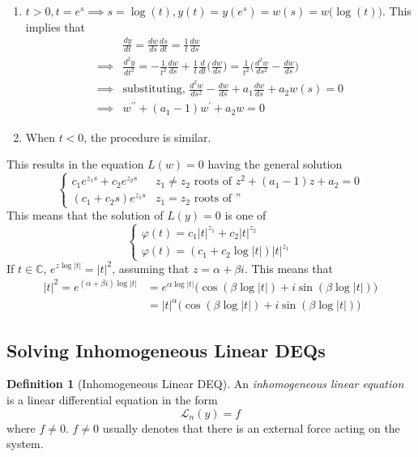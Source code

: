 \documentclass{article}
\theoremstyle{remark}
\theoremstyle{definition}
\newtheorem{definition}{Definition}[section]
\begin{document}
\begin{enumerate}
    \item $t > 0, t = e^s \implies s = \log(t), y(t) = y(e^s) = w(s) = w \big( \log(t)\big)$. This implies that
    \begin{align*}
        & \frac{d y}{d t} = \frac{dw}{ds} \frac{ds}{dt} = \frac{1}{t} \frac{dw}{ds} \\
        \implies & \frac{d^2 y}{dt^2} = -\frac{1}{t^2} \frac{dw}{ds} + \frac{1}{t} \frac{d}{dt} \bigg( \frac{dw}{ds}\bigg) = \frac{1}{t^2} \bigg( \frac{d^2 w}{ds^2} - \frac{dw}{ds} \bigg) \\
        \implies & \text{substituting, } \frac{d^2 w}{ds^2} - \frac{dw}{ds} + a_1 \frac{dw}{ds} + a_2 w(s) = 0 \\
        \implies & w^{\prime\prime} + (a_1 - 1) w^\prime + a_2 w = 0
    \end{align*}
    \item When $t<0$, the procedure is similar. 
\end{enumerate}
This results in the equation $L(w) =0$ having the general solution 
\[\begin{cases}
c_1 e^{z_1 s} + c_2 e^{z_2 s} & z_1 \neq z_2 \text{ roots of } z^2 + (a_1 - 1) z + a_2 = 0 \\
(c_1 + c_2 s) e^{z_1 s} & z_1 = z_2 \text{ roots of ''}
\end{cases}\]
This means that the solution of $L(y) = 0$ is one of
\[\begin{cases}
\varphi(t) = c_1 |t|^{z_1} + c_2 |t|^{z_2} \\
\varphi(t) = (c_1 + c_2 \log|t|) |t|^{z_1}
\end{cases}\]
If $t \in \mathbb{C}$, $e^{z \log|t|} = |t|^2$, assuming that $z = \alpha + \beta i$. This means that 
\begin{align*}
    |t|^2 = e^{(\alpha + \beta i) \log|t|} & = e^{\alpha \log|t|} \big( \cos{(\beta \log|t|)} + i \sin{(\beta \log|t|)}\big) \\
    & = |t|^\alpha \big( \cos{(\beta \log|t|)} + i \sin{(\beta \log|t|)}\big)
\end{align*}



\subsection{Solving Inhomogeneous Linear DEQs}
\begin{definition}[Inhomogeneous Linear DEQ]
An \textit{inhomogeneous linear equation} is a linear differential equation in the form
\[\mathcal{L}_n (y) = f\]
where $f \neq 0$. $f \neq 0$ usually denotes that there is an external force acting on the system. 
\end{definition}
\end{document}

